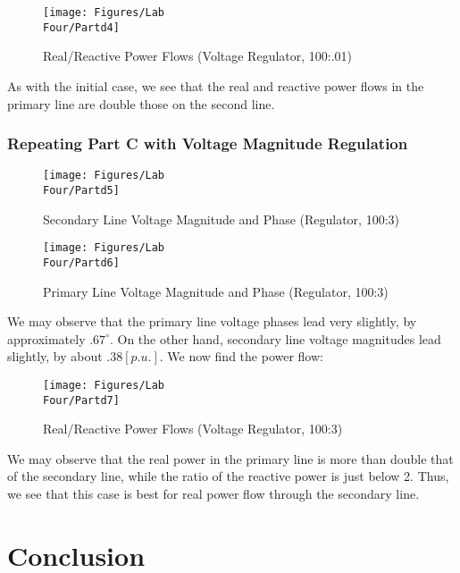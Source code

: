 \documentclass[
	letterpaper, %
	10pt, %
]{CSUniSchoolLabReport}
\begin{document}
\begin{figure}[H]
  \centering
  \texttt{[image: Figures/Lab\\ Four/Partd4]}
  \caption{Real/Reactive Power Flows (Voltage Regulator, 100:.01)}
  \label{fig:11}
\end{figure}

As with the initial case, we see that the real and reactive power flows in the primary line are double those on the second line.

\subsubsection{Repeating Part C with Voltage Magnitude Regulation}

\begin{figure}[H]
  \centering
  \texttt{[image: Figures/Lab\\ Four/Partd5]}
  \caption{Secondary Line Voltage Magnitude and Phase (Regulator, 100:3)}
  \label{fig:12}
\end{figure}

\begin{figure}[H]
  \centering
  \texttt{[image: Figures/Lab\\ Four/Partd6]}
  \caption{Primary Line Voltage Magnitude and Phase (Regulator, 100:3)}
  \label{fig:13}
\end{figure}

We may observe that the primary line voltage phases lead very slightly, by approximately $.67^{\circ}$. On the other hand, secondary line voltage magnitudes lead slightly, by about $.38[p.u.]$. We now find the power flow:

\begin{figure}[H]
  \centering
  \texttt{[image: Figures/Lab\\ Four/Partd7]}
  \caption{Real/Reactive Power Flows (Voltage Regulator, 100:3)}
  \label{fig:14}
\end{figure}

We may observe that the real power in the primary line is more than double that of the secondary line, while the ratio of the reactive power is just below 2. Thus, we see that this case is best for real power flow through the secondary line.

\section{Conclusion}
\end{document}
